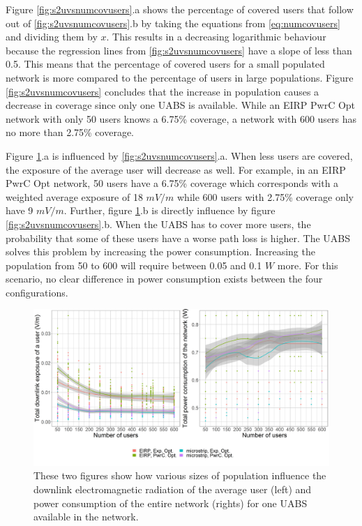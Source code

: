 Figure \ref{fig:s2uvsnumcovusers}.a shows the percentage of covered users that follow out of \ref{fig:s2uvsnumcovusers}.b by taking the equations 
from \ref{eq:numcovusers} and dividing them by $x$.
This results in a decreasing logarithmic behaviour because the regression lines from  \ref{fig:s2uvsnumcovusers} have a slope of less than 0.5.
This means that the percentage of covered users for a small populated network is more compared to the percentage of users in large populations.
Figure \ref{fig:s2uvsnumcovusers} concludes that the increase in population causes a decrease in coverage since only 
one \gls{UABS} is available. While an \gls{EIRP} \gls{PwrC Opt} network with only 50 users knows  a 6.75\% coverage, a network with 600 users has no more than 2.75\% coverage.

\clearpage
Figure  \ref{fig:s2b_dlAndPc}.a  is influenced by  \ref{fig:s2uvsnumcovusers}.a. When less users are 
covered, the exposure of the average user will decrease as well.
For example, in an EIRP \gls{PwrC Opt} network, 50 users have a 6.75\% coverage which corresponds with a weighted average exposure of  18 $mV/m$
while 600 users with 2.75\% coverage only have 9 $mV/m$.
Further,  figure \ref{fig:s2b_dlAndPc}.b is directly influence by figure \ref{fig:s2uvsnumcovusers}.b. When the \gls{UABS} has to cover more users,
the probability that some of these users have a worse path loss is higher. The \gls{UABS} solves this problem by increasing the 
power consumption. Increasing the population from 50 to 600 will require between 0.05 and 0.1 $W$ more. 
For this scenario, no clear difference in power consumption exists between the four configurations.
\begin{figure}[h!]
  \includegraphics[width=\textwidth]{../results/s2/uvsdlAndPc.png}
  \caption{These two figures show how various sizes of population influence the downlink electromagnetic radiation of the average user (left) and 
  power consumption of the entire network (rights) for one \acs{UABS} available in the network.}
  \label{fig:s2b_dlAndPc}
\end{figure}

